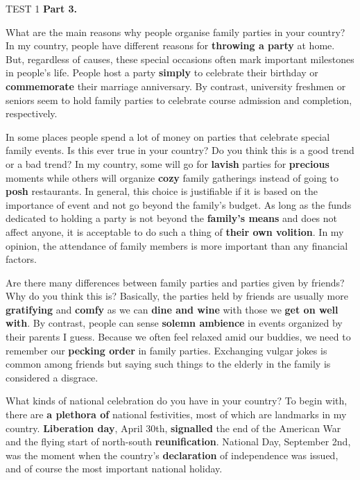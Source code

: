 \begin{glossarymc}[Cambridge 7]
\begin{test}{TEST 1}
    \noindent
    \textbf{Part 3.}
    \begin{qa}{What are the main reasons why people organise family parties in your country?}
    In my country, people have different reasons for \textbf{throwing a party} at home. But, regardless of causes, these special occasions often mark important milestones in people's life. People host a party \textbf{simply} to celebrate their birthday or \textbf{commemorate} their marriage anniversary. By contrast, university freshmen or seniors seem to hold family parties to celebrate course admission and completion, respectively.
    \end{qa}

    \begin{qa}{In some places people spend a lot of money on parties that celebrate special family events. Is this ever true in your country? Do you think this is a good trend or a bad trend?}
    In my country, some will go for \textbf{lavish} parties for \textbf{precious} moments while others will organize \textbf{cozy} family gatherings instead of going to \textbf{posh} restaurants. In general, this choice is justifiable if it is based on the importance of event and not go beyond the family's budget. As long as the funds dedicated to holding a party is not beyond the \textbf{family's means} and does not affect anyone, it is acceptable to do such a thing of \textbf{their own volition}. In my opinion, the attendance of family members is more important than any financial factors.
    \end{qa}

    \begin{qa}{Are there many differences between family parties and parties given by friends? Why do you think this is?}
    Basically, the parties held by friends are usually more \textbf{gratifying} and \textbf{comfy} as we can \textbf{dine and wine} with those we \textbf{get on well with}. By contrast, people can sense \textbf{solemn ambience} in events organized by their parents I guess. Because we often feel relaxed amid our buddies, we need to remember our \textbf{pecking order} in family parties. Exchanging vulgar jokes is common among friends but saying such things to the elderly in the family is considered a disgrace.
    \end{qa}

    \begin{qa}{What kinds of national celebration do you have in your country?}
    To begin with, there are \textbf{a plethora of} national festivities, most of which are landmarks in my country. \textbf{Liberation day}, April 30th, \textbf{signalled} the end of the American War and the flying start of north-south \textbf{reunification}. National Day, September 2nd, was the moment when the country's \textbf{declaration} of independence was issued, and of course the most important national holiday.
    \end{qa}


\end{test}
\end{glossarymc}
